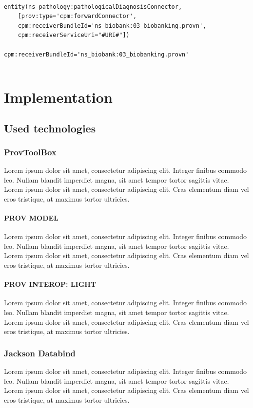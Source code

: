 \documentclass[
  digital,     %
  oneside,     %
  nosansbold,  %
  nocolorbold, %
  lof,         %
  lot,         %
]{fithesis4}
\begin{document}
\begin{verbatim}

entity(ns_pathology:pathologicalDiagnosisConnector, 
    [prov:type='cpm:forwardConnector',
    cpm:receiverBundleId='ns_biobank:03_biobanking.provn', 
    cpm:receiverServiceUri="#URI#"])

cpm:receiverBundleId='ns_biobank:03_biobanking.provn'
    
\end{verbatim}
\shorthandon{-}


\chapter{Implementation}
\section{Used technologies}
\shorthandoff{-}
\subsection{ProvToolBox}
Lorem ipsum dolor sit amet, consectetur adipiscing elit. Integer finibus commodo leo. Nullam blandit imperdiet magna, sit amet tempor tortor sagittis vitae. Lorem ipsum dolor sit amet, consectetur adipiscing elit. Cras elementum diam vel eros tristique, at maximus tortor ultricies.

\subsubsection{PROV MODEL}
Lorem ipsum dolor sit amet, consectetur adipiscing elit. Integer finibus commodo leo. Nullam blandit imperdiet magna, sit amet tempor tortor sagittis vitae. Lorem ipsum dolor sit amet, consectetur adipiscing elit. Cras elementum diam vel eros tristique, at maximus tortor ultricies.

\subsubsection{PROV INTEROP: LIGHT}
Lorem ipsum dolor sit amet, consectetur adipiscing elit. Integer finibus commodo leo. Nullam blandit imperdiet magna, sit amet tempor tortor sagittis vitae. Lorem ipsum dolor sit amet, consectetur adipiscing elit. Cras elementum diam vel eros tristique, at maximus tortor ultricies.

\subsection{Jackson Databind}
Lorem ipsum dolor sit amet, consectetur adipiscing elit. Integer finibus commodo leo. Nullam blandit imperdiet magna, sit amet tempor tortor sagittis vitae. Lorem ipsum dolor sit amet, consectetur adipiscing elit. Cras elementum diam vel eros tristique, at maximus tortor ultricies.
\end{document}
